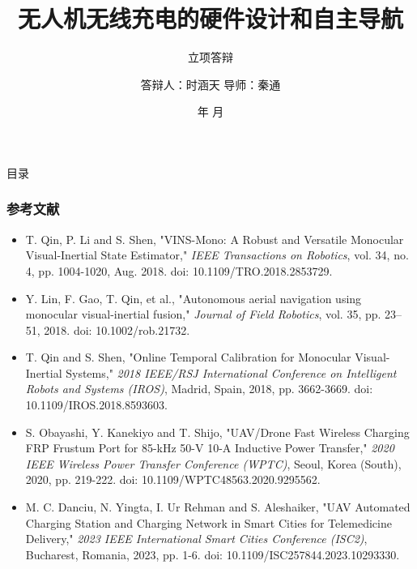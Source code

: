 \documentclass[xcolor=table,dvipsnames,svgnames,aspectratio=169]{ctexbeamer}
\author{答辩人：时涵天 \newline\newline 导师：秦通\newline\newline}
\institute[Pu Yuan Future Scholar Plan]{溥渊未来学者计划}
\date{\the\year 年 \the\month 月}
\title[UM-SJTU JI \quad\quad Shi Hantian] %
{\textbf{无人机无线充电的硬件设计和自主导航}} %
\subtitle{立项答辩}
\begin{document}
\AtBeginSection[]{
  \begin{frame}
    \tableofcontents[currentsection,subsectionstyle=show/show/hide]
  \end{frame}
}

\AtBeginSubsection[]{		       %
  \begin{frame}
    \tableofcontents[currentsection,subsectionstyle=show/shaded/hide]
  \end{frame}
}

\maketitle

\begin{frame}{目录}
  \tableofcontents[hideallsubsections]	%
\end{frame}






\begin{frame}
  \frametitle{参考文献}
  \fontsize{8}{10}\selectfont
  \begin{itemize}
      \item T. Qin, P. Li and S. Shen, "VINS-Mono: A Robust and Versatile Monocular Visual-Inertial State Estimator," \textit{IEEE Transactions on Robotics}, vol. 34, no. 4, pp. 1004-1020, Aug. 2018. doi: 10.1109/TRO.2018.2853729.
      
      \item Y. Lin, F. Gao, T. Qin, et al., "Autonomous aerial navigation using monocular visual-inertial fusion," \textit{Journal of Field Robotics}, vol. 35, pp. 23–51, 2018. doi: 10.1002/rob.21732.
      
      \item T. Qin and S. Shen, "Online Temporal Calibration for Monocular Visual-Inertial Systems," \textit{2018 IEEE/RSJ International Conference on Intelligent Robots and Systems (IROS)}, Madrid, Spain, 2018, pp. 3662-3669. doi: 10.1109/IROS.2018.8593603.
      
      \item S. Obayashi, Y. Kanekiyo and T. Shijo, "UAV/Drone Fast Wireless Charging FRP Frustum Port for 85-kHz 50-V 10-A Inductive Power Transfer," \textit{2020 IEEE Wireless Power Transfer Conference (WPTC)}, Seoul, Korea (South), 2020, pp. 219-222. doi: 10.1109/WPTC48563.2020.9295562.
      
      \item M. C. Danciu, N. Yingta, I. Ur Rehman and S. Aleshaiker, "UAV Automated Charging Station and Charging Network in Smart Cities for Telemedicine Delivery," \textit{2023 IEEE International Smart Cities Conference (ISC2)}, Bucharest, Romania, 2023, pp. 1-6. doi: 10.1109/ISC257844.2023.10293330.
  \end{itemize}
  \end{frame}
  
  
\makebottom
\end{document}
